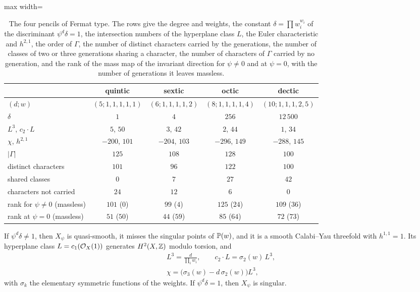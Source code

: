 \begin{table}[t]
\caption{The four pencils of Fermat type. The rows give the degree and
weights, the constant $\delta=\prod w_i^{w_i}$ of the discriminant
$\psi^d\delta=1$, the intersection numbers of the hyperplane class $L$, the
Euler characteristic and $h^{2,1}$, the order of $\Gamma$, the number of
distinct characters carried by the generations, the number of classes of
two or three generations sharing a character, the number of characters of
$\Gamma$ carried by no generation, and the rank of the mass map of the
invariant direction for $\psi\ne0$ and at $\psi=0$, with the number of
generations it leaves massless.}
\label{tab:wdata}
\centering
\begin{adjustbox}{max width=\linewidth}\begin{tabular}{lcccc}
\toprule
 & quintic & sextic & octic & dectic\\
\midrule
$(d;w)$ & $(5;1,1,1,1,1)$ & $(6;1,1,1,1,2)$ & $(8;1,1,1,1,4)$ & $(10;1,1,1,2,5)$\\
$\delta$ & $1$ & $4$ & $256$ & $12\,500$\\
$L^3$, $c_2\cdot L$ & $5$, $50$ & $3$, $42$ & $2$, $44$ & $1$, $34$\\
$\chi$, $h^{2,1}$ & $-200$, $101$ & $-204$, $103$ & $-296$, $149$ & $-288$, $145$\\
$|\Gamma|$ & $125$ & $108$ & $128$ & $100$\\
distinct characters & $101$ & $96$ & $122$ & $100$\\
shared classes & $0$ & $7$ & $27$ & $42$\\
characters not carried & $24$ & $12$ & $6$ & $0$\\
rank for $\psi\ne0$ (massless) & $101$ ($0$) & $99$ ($4$) & $125$ ($24$) & $109$ ($36$)\\
rank at $\psi=0$ (massless) & $51$ ($50$) & $44$ ($59$) & $85$ ($64$) & $72$ ($73$)\\
\bottomrule
\end{tabular}\end{adjustbox}
\end{table}

\begin{lemma}\label{lem:wsmooth}
If $\psi^d\delta\ne1$, then $X_\psi$ is quasi-smooth, it misses the singular
points of $\mathbb{P}(w)$, and it is a smooth Calabi--Yau threefold with
$h^{1,1}=1$. Its hyperplane class $L=c_1(\mathcal{O}_X(1))$ generates $H^2(X,\mathbb{Z})$
modulo torsion, and
\begin{equation}\label{eq:wchern}
\begin{gathered}
L^3=\frac{d}{\prod_iw_i},\qquad c_2\cdot L=\sigma_2(w)\,L^3,\\
\chi=\big(\sigma_3(w)-d\,\sigma_2(w)\big)L^3,
\end{gathered}
\end{equation}
with $\sigma_k$ the elementary symmetric functions of the weights. If
$\psi^d\delta=1$, then $X_\psi$ is singular.
\end{lemma}

